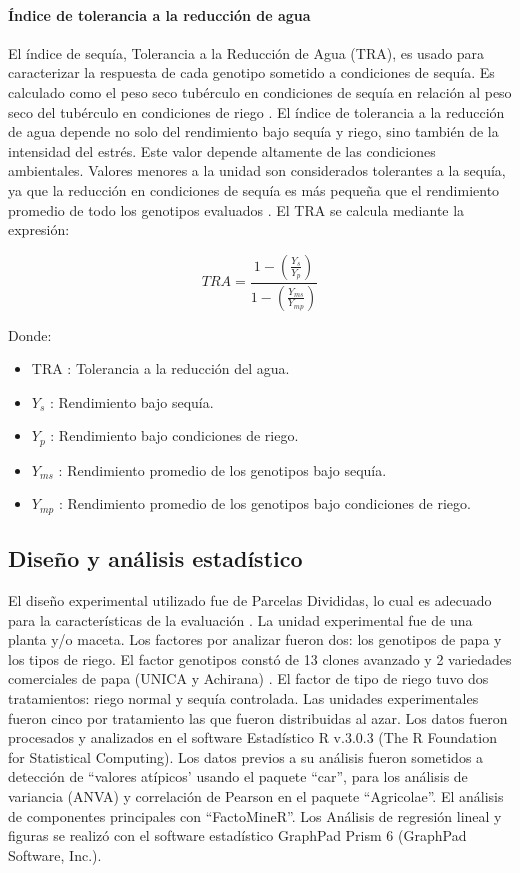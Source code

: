\documentclass[fleqn,10pt]{Flavio}\usepackage[]{graphicx}\usepackage[]{color}
\begin{document}
\paragraph{\'Indice de tolerancia a la reducci\'on de agua} El \'indice de sequ\'ia, Tolerancia a la Reducci\'on de Agua (TRA), es usado para caracterizar la respuesta de cada genotipo sometido a condiciones de sequ\'ia. Es calculado como el peso seco tub\'erculo en condiciones de sequ\'ia en relaci\'on al peso seco del tub\'erculo en condiciones de riego \citep{Deblonde2001}. El \'indice de tolerancia a la reducci\'on de agua depende no solo del rendimiento bajo sequ\'ia y riego, sino tambi\'en de la intensidad del estr\'es. Este valor depende altamente de las condiciones ambientales. Valores menores a la unidad son considerados tolerantes a la sequ\'ia, ya que la reducci\'on en condiciones de sequ\'ia es m\'as peque\~na que el rendimiento promedio de todo los genotipos evaluados \cite{Cabello2013}. El TRA se calcula mediante la expresi\'on:

$$ TRA =   \frac { 1 - (\frac{Y_s}{Y_p}) } { 1 - (\frac{Y_{ms}}{Y_{mp}}) } $$


Donde:

\begin{itemize}[noitemsep]
  \item TRA   : Tolerancia a la reducci\'on del agua. 
  \item $Y_s$ : Rendimiento bajo sequ\'ia. 
  \item $Y_p$ : Rendimiento bajo condiciones de riego. 
  \item $Y_{ms}$ : Rendimiento promedio de los genotipos bajo sequ\'ia.
  \item $Y_{mp}$ : Rendimiento promedio de los genotipos bajo condiciones de riego. 
\end{itemize}


\subsection{Dise\~no y an\'alisis estad\'istico}

El dise\~no experimental utilizado fue de Parcelas Divididas, lo cual es adecuado para la caracter\'isticas de la evaluaci\'on \citep{Montgomery1999}. La unidad experimental fue de una planta y/o maceta. Los factores por analizar fueron dos: los genotipos de papa y los tipos de riego. El factor genotipos const\'o de 13 clones avanzado y 2 variedades comerciales de papa  (UNICA y Achirana) . El factor de tipo de riego tuvo dos tratamientos: riego normal y sequ\'ia controlada. Las unidades experimentales fueron cinco por tratamiento las que fueron distribuidas al azar. Los datos fueron procesados y analizados en el software Estad\'istico R v.3.0.3 (The R Foundation for Statistical Computing). Los datos previos a su an\'alisis fueron sometidos a detecci\'on de ``valores at\'ipicos' usando el paquete ``car'', para los an\'alisis de variancia (ANVA) y correlaci\'on de Pearson en el paquete ``Agricolae''. El an\'alisis de componentes principales con ``FactoMineR''. Los An\'alisis de regresi\'on lineal y figuras se realiz\'o con el software estad\'istico GraphPad Prism 6 (GraphPad Software, Inc.). 
\end{document}
